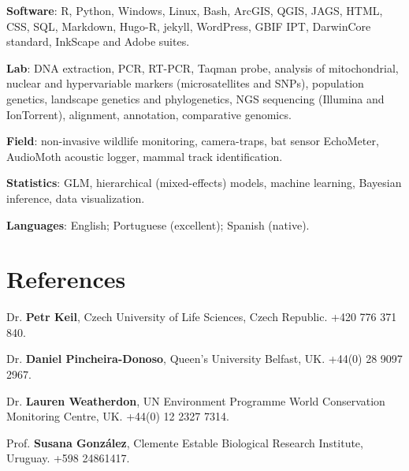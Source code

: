 {\bf Software}: R, Python, Windows, Linux, Bash, ArcGIS, QGIS, JAGS, HTML, CSS, SQL, Markdown, Hugo-R, jekyll, WordPress, GBIF IPT, DarwinCore standard, InkScape and Adobe suites.

\medskip

{\bf Lab}: DNA extraction, PCR, RT-PCR, Taqman probe, analysis of mitochondrial, nuclear and hypervariable markers (microsatellites and SNPs), population genetics, landscape genetics and phylogenetics, NGS sequencing (Illumina and IonTorrent), alignment, annotation, comparative genomics.

\medskip

{\bf Field}: non-invasive wildlife monitoring, camera-traps, bat sensor EchoMeter, AudioMoth acoustic logger, mammal track identification.

\medskip

{\bf Statistics}: GLM, hierarchical (mixed-effects) models, machine learning, Bayesian inference, data visualization.

\medskip

{\bf Languages}: English; Portuguese (excellent); Spanish (native).

\HRule

\section{References}


Dr. \textbf{Petr Keil}, Czech University of Life Sciences, Czech Republic. \phone +420 776 371 840. 

\medskip

Dr. \textbf{Daniel Pincheira-Donoso}, Queen’s University Belfast, UK. \phone +44(0) 28 9097 2967. 
\medskip

Dr. \textbf{Lauren Weatherdon}, UN Environment Programme World Conservation Monitoring Centre, UK. \phone +44(0) 12 2327 7314. 

\medskip

Prof. \textbf{Susana González}, Clemente Estable Biological Research Institute, Uruguay. \phone +598 24861417.



\grid
\grid
